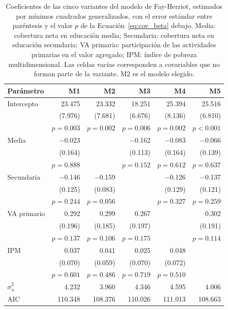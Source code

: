     \begin{table}[!htbp]
    \centering
    \footnotesize
    \caption{Coeficientes de las cinco variantes del modelo de Fay-Herriot, estimados por mínimos
             cuadrados generalizados, con el error estándar entre paréntesis y el valor $p$ de la
             Ecuación~\ref{eq:cov_beta} debajo. Media: cobertura neta en educación media;
             Secundaria: cobertura neta en educación secundaria; VA primario: participación de
             las actividades primarias en el valor agregado; IPM: índice de pobreza
             multidimensional. Las celdas vacías corresponden a covariables que no forman parte
             de la variante. M2 es el modelo elegido.}
    \label{tab:coef_variantes}
    \renewcommand{\arraystretch}{1.15}
    \setlength{\tabcolsep}{4pt}
    \begin{tabular}{l r r r r r}
    \toprule
    \textbf{Parámetro} & \textbf{M1} & \textbf{M2} & \textbf{M3} & \textbf{M4} & \textbf{M5} \\
    \midrule
    Intercepto  & 23.475 & 23.332 & 18.251 & 25.394 & 25.516 \\
                & (7.976) & (7.681) & (6.676) & (8.136) & (6.810) \\
                & $p=0.003$ & $p=0.002$ & $p=0.006$ & $p=0.002$ & $p<0.001$ \\[3pt]
    Media       & $-$0.023 &  & $-$0.162 & $-$0.083 & $-$0.066 \\
                & (0.164) &  & (0.113) & (0.164) & (0.139) \\
                & $p=0.888$ &  & $p=0.152$ & $p=0.612$ & $p=0.637$ \\[3pt]
    Secundaria  & $-$0.146 & $-$0.159 &  & $-$0.126 & $-$0.137 \\
                & (0.125) & (0.083) &  & (0.129) & (0.121) \\
                & $p=0.244$ & $p=0.056$ &  & $p=0.327$ & $p=0.259$ \\[3pt]
    VA primario & 0.292 & 0.299 & 0.267 &  & 0.302 \\
                & (0.196) & (0.185) & (0.197) &  & (0.191) \\
                & $p=0.137$ & $p=0.106$ & $p=0.175$ &  & $p=0.114$ \\[3pt]
    IPM         & 0.037 & 0.041 & 0.025 & 0.048 &  \\
                & (0.070) & (0.059) & (0.070) & (0.072) &  \\
                & $p=0.601$ & $p=0.486$ & $p=0.719$ & $p=0.510$ &  \\
    \midrule
    $\hat{\sigma}_u^2$ & 4.232 & 3.960 & 4.346 & 4.595 & 4.006 \\
    AIC                & 110.348 & 108.376 & 110.026 & 111.013 & 108.663 \\
    \bottomrule
    \end{tabular}
    \end{table}
    \FloatBarrier

